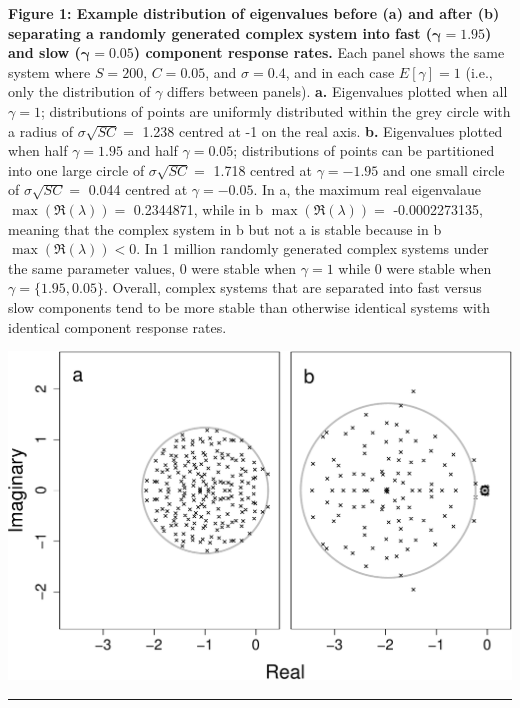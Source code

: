 \documentclass[]{article}
\begin{document}
\textbf{Figure 1: Example distribution of eigenvalues before (a) and
after (b) separating a randomly generated complex system into fast
(\(\boldsymbol{\gamma} = 1.95\)) and slow
(\(\boldsymbol{\gamma} = 0.05\)) component response rates.} Each panel
shows the same system where \(S = 200\), \(C = 0.05\), and
\(\sigma = 0.4\), and in each case \(E[\gamma] = 1\) (i.e., only the
distribution of \(\gamma\) differs between panels). \textbf{a.}
Eigenvalues plotted when all \(\gamma = 1\); distributions of points are
uniformly distributed within the grey circle with a radius of
\(\sigma\sqrt{SC} =\) 1.238 centred at -1 on the real axis. \textbf{b.}
Eigenvalues plotted when half \(\gamma = 1.95\) and half
\(\gamma = 0.05\); distributions of points can be partitioned into one
large circle of \(\sigma\sqrt{SC} =\) 1.718 centred at
\(\gamma = -1.95\) and one small circle of \(\sigma\sqrt{SC} =\) 0.044
centred at \(\gamma = -0.05\). In a, the maximum real eigenvalaue
\(\max\left(\Re(\lambda)\right) =\) 0.2344871, while in b
\(\max\left(\Re(\lambda)\right) =\) -0.0002273135, meaning that the
complex system in b but not a is stable because in b
\(\max\left(\Re(\lambda)\right) < 0\). In 1 million randomly generated
complex systems under the same parameter values, 0 were stable when
\(\gamma = 1\) while 0 were stable when \(\gamma = \{1.95, 0.05\}\).
Overall, complex systems that are separated into fast versus slow
components tend to be more stable than otherwise identical systems with
identical component response rates.

\includegraphics{ms_files/figure-latex/unnamed-chunk-6-1.pdf}

\begin{center}\rule{0.5\linewidth}{\linethickness}\end{center}
\end{document}
